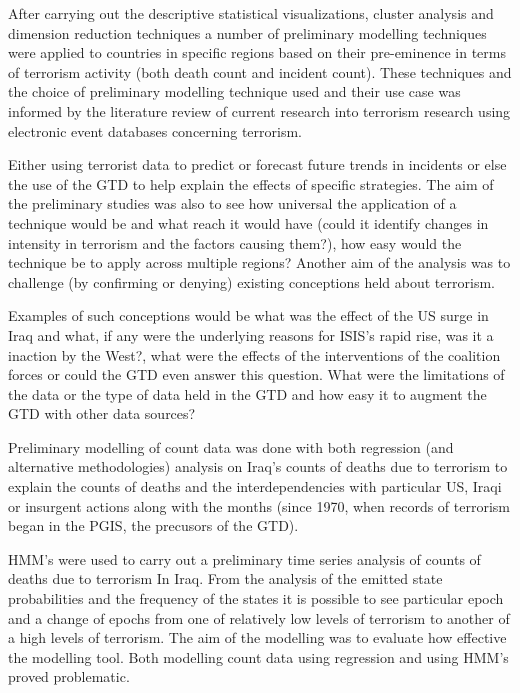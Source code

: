 After carrying out the descriptive statistical visualizations, cluster analysis and dimension reduction techniques a number of preliminary modelling techniques were applied to countries in specific regions based on their pre-eminence in terms of terrorism activity (both death count and incident count). These techniques and the choice of preliminary  modelling technique used and their use case was informed by the literature review of current research into terrorism research using electronic event databases concerning terrorism. 

Either using terrorist data to predict or forecast future trends in incidents or else the use of the GTD to help explain the effects of specific strategies. The aim of the preliminary studies was also to see how universal the application of a technique would be and what reach it would have (could it identify changes in intensity in terrorism and the factors causing them?), how easy would the technique be to apply across multiple regions? Another aim of the analysis was to challenge (by confirming or denying) existing conceptions held about terrorism.

Examples of such conceptions would be what was the effect of the US surge in Iraq and what, if any were the underlying reasons for ISIS's rapid rise, was it a inaction by the West?, what were the effects of the interventions of the coalition forces  or could the GTD even answer this question. What were the limitations of the data or the type of data held in the GTD and how easy it to augment the GTD with other data sources?

Preliminary modelling of count data was done with both regression (and alternative methodologies) analysis on Iraq's counts of deaths due to terrorism to explain the counts of deaths and the interdependencies with particular US, Iraqi or insurgent actions along with the months (since 1970, when records of terrorism began in the PGIS, the precusors of the GTD). 

HMM's were used to carry out a preliminary time series analysis of counts of deaths due to terrorism In Iraq. From the analysis of the emitted state probabilities and the frequency of the states it is possible to see particular epoch and a change of epochs from one of relatively low levels of terrorism to another of a high levels of terrorism. The aim of the modelling was to evaluate how effective the modelling tool. Both modelling count data using regression and using HMM's proved problematic. 

